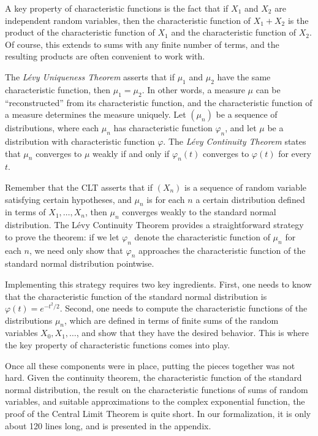 \documentclass{svjour3}
\newcommand{\ph}{\varphi}
\begin{document}
A key property of characteristic functions is the fact that if $X_1$ and $X_2$ are independent random variables, then the characteristic function of $X_1 + X_2$ is the product of the characteristic function of $X_1$ and the characteristic function of $X_2$. Of course, this extends to sums with any finite number of terms, and the resulting products are often convenient to work with.

The \emph{L\'evy Uniqueness Theorem} asserts that if $\mu_1$ and $\mu_2$ have the same characteristic function, then $\mu_1 = \mu_2$. In other words, a measure $\mu$ can be ``reconstructed'' from its characteristic function, and the characteristic function of a measure determines the measure uniquely.  Let $(\mu_n)$ be a sequence of distributions, where each $\mu_n$ has characteristic function $\ph_n$, and let $\mu$ be a distribution with characteristic function $\ph$. The \emph{L\'evy Continuity Theorem} states that $\mu_n$ converges to $\mu$ weakly if and only if $\ph_n(t)$ converges to $\ph(t)$ for every $t$.

Remember that the CLT asserts that if $(X_n)$ is a sequence of random variable satisfying certain hypotheses, and $\mu_n$ is for each $n$ a certain distribution defined in terms of $X_1, \ldots, X_n$, then $\mu_n$ converges weakly to the standard normal distribution. The L\'evy Continuity Theorem provides a straightforward strategy to prove the theorem: if we let $\ph_n$ denote the characteristic function of $\mu_n$ for each $n$, we need only show that $\ph_n$ approaches the characteristic function of the standard normal distribution pointwise.

Implementing this strategy requires two key ingredients. First, one needs to know that the characteristic function of the standard normal distribution is $\ph(t) = e^{-t^2/2}$. Second, one needs to compute the characteristic functions of the distributions $\mu_n$, which are defined in terms of finite sums of the random variables $X_0, X_1, \ldots$, and show that they have the desired behavior. This is where the key property of characteristic functions comes into play.

Once all these components were in place, putting the pieces together was not hard. Given the continuity theorem, the characteristic function of the standard normal distribution, the result on the characteristic functions of sums of random variables, and suitable approximations to the complex exponential function, the proof of the Central Limit Theorem is quite short. In our formalization, it is only about 120 lines long, and is presented in the appendix.
\end{document}
